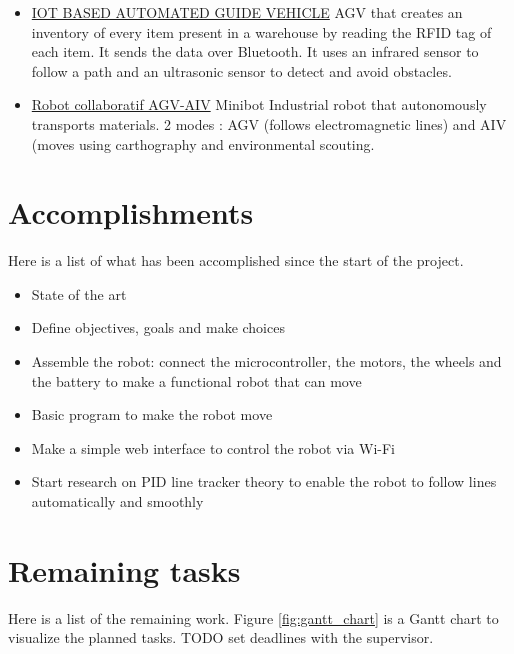 \documentclass{article}
\begin{document}
\begin{itemize}
    \item \href{https://www.nielit.gov.in/sites/default/files/Aurangabad/IRJET-V5I5624\%20(1).pdf}{IOT BASED AUTOMATED GUIDE VEHICLE} AGV that creates an inventory of every item present in a warehouse by reading the RFID tag of each item. It sends the data over Bluetooth. It uses an infrared sensor to follow a path and an ultrasonic sensor to detect and avoid obstacles.
    \item \href{https://www.usinenouvelle.com/expo/robot-collaboratif-agv-aiv-minibot-p384315470.html#:~:text=La\%20version\%20AGV\%20(Automated\%20Guided,dans\%20lequel\%20il\%20se\%20trouve.}{Robot collaboratif AGV-AIV} Minibot Industrial robot that autonomously transports materials. 2 modes : AGV (follows electromagnetic lines) and AIV (moves using carthography and environmental scouting.
\end{itemize}

\section{Accomplishments}
    
Here is a list of what has been accomplished since the start of the project.

\begin{itemize}
    \item State of the art
    \item Define objectives, goals and make choices
    \item Assemble the robot: connect the microcontroller, the motors, the wheels and the battery to make a functional robot that can move
    \item Basic program to make the robot move
    \item Make a simple web interface to control the robot via Wi-Fi
    \item Start research on PID line tracker theory to enable the robot to follow lines automatically and smoothly
\end{itemize}

\section{Remaining tasks}

Here is a list of the remaining work. Figure \ref{fig:gantt_chart} is a Gantt chart to visualize the planned tasks. TODO set deadlines with the supervisor.
\end{document}
